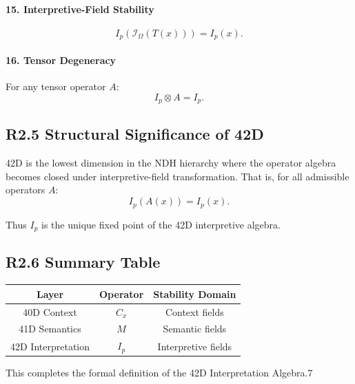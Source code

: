 \paragraph{15. Interpretive-Field Stability}
\[
I_p(\mathcal{I}_{\Omega}(T(x))) = I_p(x).
\]

\paragraph{16. Tensor Degeneracy}
For any tensor operator $A$:
\[
I_p \otimes A = I_p.
\]

\subsection*{R2.5 Structural Significance of 42D}

42D is the lowest dimension in the NDH hierarchy where the operator
algebra becomes closed under interpretive-field transformation. That is,
for all admissible operators $A$:
\[
I_p(A(x)) = I_p(x).
\]

Thus $I_p$ is the unique fixed point of the 42D interpretive algebra.

\subsection*{R2.6 Summary Table}

\begin{center}
\begin{tabular}{|c|c|c|}
\hline
Layer & Operator & Stability Domain \\
\hline
40D Context & $C_x$ & Context fields \\
41D Semantics & $M$ & Semantic fields \\
42D Interpretation & $I_p$ & Interpretive fields \\
\hline
\end{tabular}
\end{center}

This completes the formal definition of the 42D Interpretation Algebra.7
